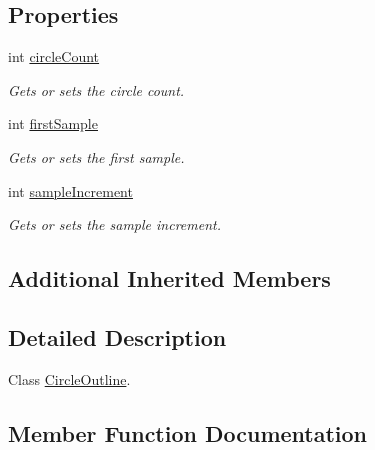 \subsection*{Properties}
\begin{DoxyCompactItemize}
\item 
int \hyperlink{class_circle_outline_a9b716058213c2669cfadf143ce970c48}{circle\+Count}
\begin{DoxyCompactList}\small\item\em Gets or sets the circle count. \end{DoxyCompactList}\item 
int \hyperlink{class_circle_outline_aadda26b329945bc2a1fb1d96cf0e7515}{first\+Sample}
\begin{DoxyCompactList}\small\item\em Gets or sets the first sample. \end{DoxyCompactList}\item 
int \hyperlink{class_circle_outline_a3b50a97b874f55d06e09c2a96e3ca121}{sample\+Increment}
\begin{DoxyCompactList}\small\item\em Gets or sets the sample increment. \end{DoxyCompactList}\end{DoxyCompactItemize}
\subsection*{Additional Inherited Members}


\subsection{Detailed Description}
Class \hyperlink{class_circle_outline}{Circle\+Outline}. 



\subsection{Member Function Documentation}
\mbox{\label{class_circle_outline_a60ecaf1389896d2bca9b38c8767ca20a}} 
